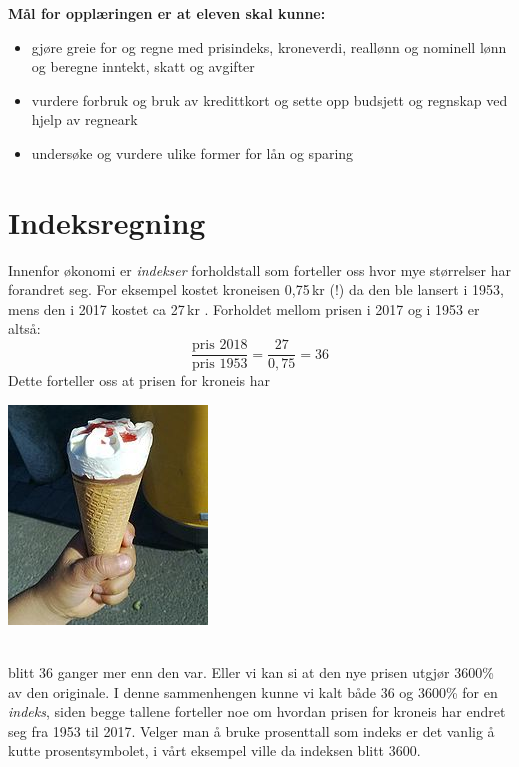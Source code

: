 




\renewcommand{\arraystretch}{1.1}
\textbf{Mål for opplæringen er at eleven skal kunne:}
\begin{itemize}
	\item gjøre greie for og regne med prisindeks, kroneverdi, reallønn og nominell lønn og beregne inntekt, skatt og avgifter
	\item vurdere forbruk og bruk av kredittkort og sette opp budsjett og regnskap ved hjelp av regneark
	\item undersøke og vurdere ulike former for lån og sparing
\end{itemize}
\newpage
\section{Indeksregning}
\parbox{0.6\linewidth}{Innenfor økonomi er \textit{indekser} forholdstall som forteller oss hvor mye størrelser har forandret seg. For eksempel kostet kroneisen 0,75\,kr (!) da den ble lansert i 1953, mens den i 2017 kostet ca 27\,kr . Forholdet mellom prisen i 2017 og i 1953 er altså:
	\[ \frac{\text{pris 2018}}{\text{pris 1953}}=\frac{27}{0,75}= 36 \]
Dette forteller oss at prisen for kroneis har
}
\parbox[r]{0.3\linewidth}{\includegraphics[scale=2]{kr}}\\[2pt]
blitt 36 ganger mer enn den var. Eller vi kan si at den nye prisen utgjør 3600\% av den originale. I denne sammenhengen kunne vi kalt både 36 og 3600\% for en \textit{indeks}, siden begge tallene forteller noe om hvordan prisen for kroneis har endret seg fra 1953 til 2017. Velger man å bruke prosenttall som indeks er det vanlig å kutte prosentsymbolet, i vårt eksempel ville da indeksen blitt 3600.

